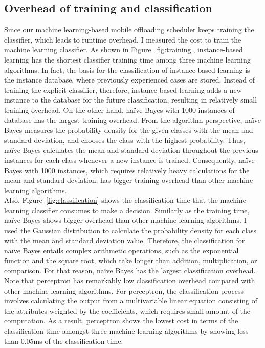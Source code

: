 {{\subsection{Overhead of training and classification}
\label{online:overhead}
Since our machine learning-based mobile offloading scheduler keeps
training the classifier, which leads to runtime overhead, I
measured the cost to train the machine learning classifier.
%
As shown in Figure~\ref{fig:training}, instance-based learning has the shortest
classifier training time among three machine learning algorithms.  
%
In fact, the basis for the classification of instance-based learning is
the instance database, where previously experienced cases are stored.
%
Instead of training the explicit classifier, therefore, instance-based
learning adds a new instance to the database for the future
classification, resulting in relatively small training overhead.
%
On the other hand, na\"{i}ve Bayes with 1000 instances of database has
the largest training overhead. 
%
From the algorithm perspective, na\"{i}ve Bayes measures the
probability density for the given classes with the mean and standard
deviation, and chooses the class with the highest probability.
%
Thus, na\"{i}ve Bayes calculates the mean and standard deviation
throughout the previous instances for each class whenever a new instance
is trained.
%
Consequently, na\"{i}ve Bayes with 1000 instances, which requires
relatively heavy calculations for the mean and standard deviation, has
bigger training overhead than other machine learning algorithms.\\
%
Also, Figure~\ref{fig:classification} shows the classification time that the machine
learning classifier consumes to make a decision.
%
Similarly as the training time, na\"{i}ve Bayes shows bigger overhead
than other machine learning algorithms.
%
I used the Gaussian distribution to calculate the probability
density for each class with the mean and standard deviation value.
%
Therefore, the classification for na\"{i}ve Bayes entails complex
arithmetic operations, such as the exponential function and the square
root, which take longer than addition, multiplication, or comparison.
%
For that reason, na\"{i}ve Bayes has the largest classification overhead.
%
Note that perceptron has remarkably low classification overhead compared
with other machine learning algorithms. 
%
For perceptron, the classification process involves calculating the
output from a multivariable linear equation consisting of the attributes
weighted by the coefficients, which requires small amount of
the computation. 
%
As a result, perceptron shows the lowest cost in terms of the
classification time amongst three machine learning algorithms by showing
less than 0.05ms of the classification time.
%

}}
